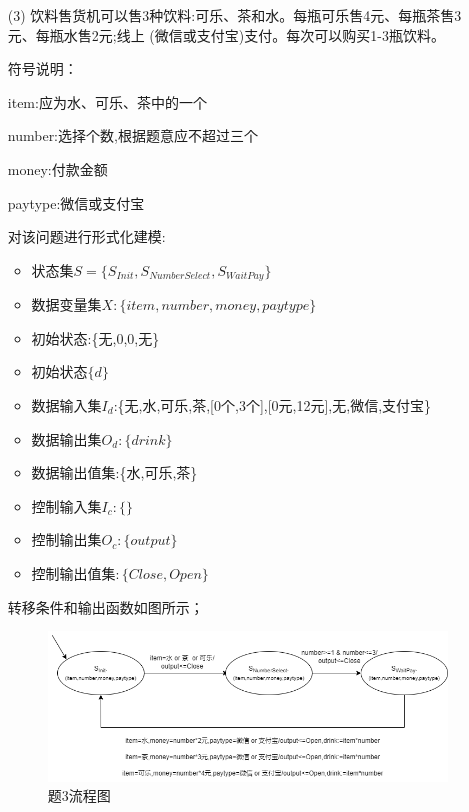 \documentclass[11pt,oneside,a4paper]{article}
\begin{document}
\begin{enumerate}
    
    \item[(3)] 饮料售货机可以售3种饮料:可乐、茶和水。每瓶可乐售4元、每瓶茶售3元、每瓶水售2元;线上 (微信或支付宝)支付。每次可以购买1-3瓶饮料。

    符号说明：\par
    item:应为水、可乐、茶中的一个 \par
    number:选择个数,根据题意应不超过三个\par
    money:付款金额\par
    paytype:微信或支付宝 \par

    对该问题进行形式化建模:
    \begin{itemize}
        \item 状态集$S=\{S_{Init},S_{NumberSelect},S_{WaitPay}\}$
        \item 数据变量集$X:\{item,number,money,paytype\}$
        \item 初始状态:\{无,0,0,无\}
        \item 初始状态$\{d\}$
        \item 数据输入集$I_d$:\{无,水,可乐,茶,[0个,3个],[0元,12元],无,微信,支付宝\}
        \item 数据输出集$O_d:\{drink\}$
        \item 数据输出值集:\{水,可乐,茶\}
        \item 控制输入集$I_c:\{\}$
        \item 控制输出集$O_c:\{output\}$ 
        \item 控制输出值集$:\{Close,Open\}$ 
        
    \end{itemize}   
           
    转移条件和输出函数如图所示；

    \begin{figure}[!h]
        \centering
        \includegraphics[width=1.2\textwidth]{3_3_Shopping.png}
        \caption{题3流程图}
    \end{figure}

\end{enumerate}
\end{document}
